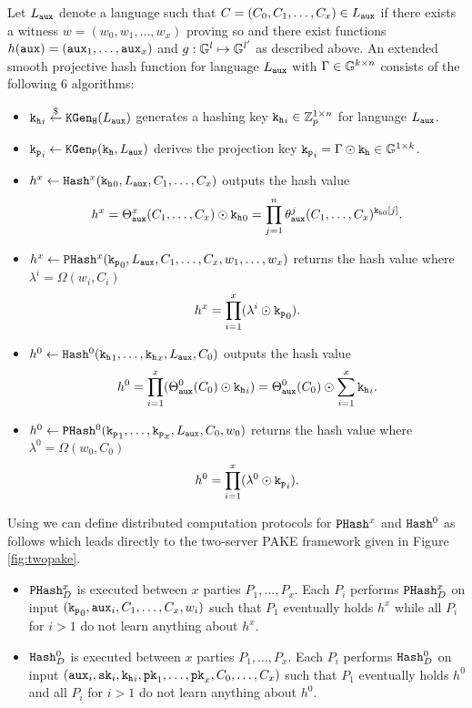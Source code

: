\begin{definition}[\SPHFF]\label{def:symgensphf}
Let $L_\mathtt{aux}$ denote a language such that $C=(C_0,C_1,\dots,C_x)\in L_\mathtt{aux}$ if there exists a witness $w=(w_0,w_1,\dots,w_x)$ proving so and there exist functions $h(\mathtt{aux})=(\mathtt{aux}_1,\dots,\mathtt{aux}_x)$ and $g:\mathbb{G}^l\mapsto\mathbb{G}^{l'}$ as described above.
An extended smooth projective hash function for language $L_\mathtt{aux}$ with $\Gamma\in\mathbb{G}^{k\times n}$ consists of the following 6 algorithms:

\begin{itemize}
	\item $\mathtt{k_h}_i\stackrel{\$}{\gets}\mathtt{KGen_H}(L_\mathtt{aux})$ generates a hashing key $\mathtt{k_h}_i\in\mathbb{Z}_p^{1\times n}$ for language $L_\mathtt{aux}$.
	
	\item $\mathtt{k_p}_i\gets\mathtt{KGen_P}(\mathtt{k_h},L_\mathtt{aux})$ derives the projection key $\mathtt{k_p}_i=\Gamma \odot \mathtt{k_h}\in\mathbb{G}^{1\times k}$.
	
	\item $h^x\gets\mathtt{Hash}^x(\mathtt{k_h}_0,L_\mathtt{aux},C_1,\dots,C_x)$ outputs the hash value
	$$h^x=\Theta^x_{\mathtt{aux}}(C_1,\dots,C_x)\odot\mathtt{k_h}_0=\prod^{n}_{j=1} \theta_\mathtt{aux}^j(C_1,\dots,C_x)^{\mathtt{k_h}_0[j]}.$$
	
	\item $h^x\gets\mathtt{PHash}^x(\mathtt{k_p}_0,L_\mathtt{aux},C_1,\dots,C_x,w_1,\dots,w_x)$ returns the hash value where $\lambda^i=\Omega(w_i,C_i)$
	\[h^x=\prod^{x}_{i=1}(\lambda^i\odot \mathtt{k_p}_0).\] 
	
	\item $h^0\gets\mathtt{Hash}^0(\mathtt{k_h}_1,\dots,\mathtt{k_h}_x,L_\mathtt{aux},C_0)$ outputs the hash value 
	\[h^0=\prod^{x}_{i=1}(\Theta_{\mathtt{aux}}^0(C_0)\odot\mathtt{k_h}_i)=\Theta_{\mathtt{aux}}^0(C_0)\odot \sum^x_{i=1}\mathtt{k_h}_i.\]
	
	\item $h^0\gets\mathtt{PHash}^0(\mathtt{k_p}_1,\dots,\mathtt{k_p}_x,L_\mathtt{aux},C_0,w_0)$ returns the hash value where $\lambda^0=\Omega(w_0,C_0)$
	\[h^0=\prod^{x}_{i=1}(\lambda^0\odot \mathtt{k_p}_i).\]
\end{itemize}
\eod
\end{definition}

\noindent
Using \SPHFF we can define distributed computation protocols for $\mathtt{PHash}^x$ and $\mathtt{Hash}^0$ as follows which leads directly to the two-server \ac{PAKE} framework given in Figure \ref{fig:twopake}.
\begin{itemize}
\item $\mathtt{PHash}^x_D$ is executed between $x$ parties $P_1,\dots,P_x$.
	Each $P_i$ performs $\mathtt{PHash}^x_D$ on input $(\mathtt{k_p}_0,\mathtt{aux}_i,\allowbreak C_1,\dots,C_x,w_i)$ such that $P_1$ eventually holds $h^x$ while all $P_i$ for $i>1$ do not learn anything about $h^x$.
	
	\item $\mathtt{Hash}^0_D$ is executed between $x$ parties $P_1,\dots,P_x$.
	Each $P_i$ performs $\mathtt{Hash}^0_D$ on input $(\mathtt{aux}_i,\mathtt{sk}_i,\mathtt{k_h}_i,\allowbreak \mathtt{pk}_1,\dots,\mathtt{pk}_x,C_0,\dots,C_x)$ such that $P_1$ eventually holds $h^0$ and all $P_i$ for $i>1$ do not learn anything about $h^0$.
\end{itemize}

